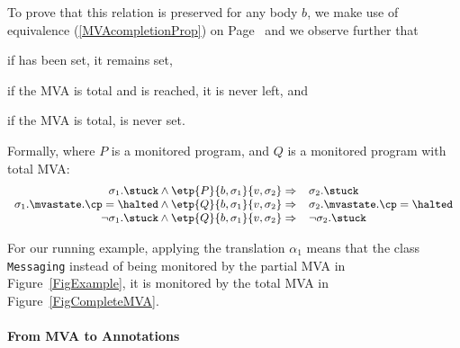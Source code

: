 To prove that this relation is preserved for any body \(b\), we make
use of equivalence (\ref{MVAcompletionProp}) on
Page~\pageref{MVAcompletionProp} and we observe further that
\begin{inparaenum}
\item if \stuck has been set, it remains set,
\item if the MVA is total and \halted is reached, it is never left, and
\item if the MVA is total, \stuck is never set.
\end{inparaenum} Formally, where \(P\) is a monitored program, and
\(Q\) is a monitored program with total MVA:
\[{\small
\begin{array}[t]{rl}
\sigma_1.\stuck \wedge \etp{P}{b,\sigma_1}{v,\sigma_2} \Rightarrow &
\sigma_2.\stuck \\
\sigma_1.\mvastate.\cp = \halted \wedge
\etp{Q}{b,\sigma_1}{v,\sigma_2} \Rightarrow &
\sigma_2.\mvastate.\cp = \halted \\
\neg \sigma_1.\stuck \wedge \etp{Q}{b,\sigma_1}{v,\sigma_2} \Rightarrow &
\neg \sigma_2.\stuck
\end{array}}
\]

For our running example, applying the translation \(\alpha_1\) means that
the class \texttt{Messaging} instead of being monitored by the partial MVA
in Figure~\ref{FigExample}, it is monitored by the total MVA in
Figure~\ref{FigCompleteMVA}.


\paragraph{From MVA to Annotations}

